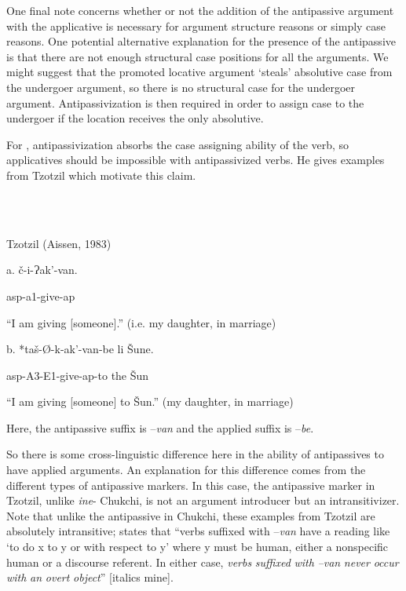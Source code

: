 \documentclass[output=paper,modfonts,nonflat]{langsci/langscibook}
\begin{document}
One final note concerns whether or not the addition of the antipassive argument with the applicative is necessary for argument structure reasons or simply case reasons.  One potential alternative explanation for the presence of the antipassive is that there are not enough structural case positions for all the arguments.  We might suggest that the promoted locative argument ‘steals’ absolutive case from the undergoer argument, so there is no structural case for the undergoer argument.  Antipassivization is then required in order to assign case to the undergoer if the location receives the only absolutive.  

For \citet{Baker1988}, antipassivization absorbs the case assigning ability of the verb, so applicatives should be impossible with antipassivized verbs.  He gives examples from Tzotzil which motivate this claim.\textstyleEndnoteSymbol{} 

\ea%
    \label{ex:key:15}
    \gll\\
        \\
    \glt
    \z

          Tzotzil (Aissen, 1983)

a.  č-i-Ɂak’-van.

  asp{}-a1{}-give{}-ap

  “I am giving [someone].”    (i.e. my daughter, in marriage)

b.  *taš-Ø-k-ak’-van-be  li  Šune.

  asp{}-A3-E1-give-ap{}-to  the  Šun

  “I am giving [someone] to Šun.”  (my daughter, in marriage)

Here, the antipassive suffix is –\textit{van} and the applied suffix is –\textit{be}.

So there is some cross-linguistic difference here in the ability of antipassives to have applied arguments.  An explanation for this difference comes from the different types of antipassive markers.  In this case, the antipassive marker in Tzotzil, unlike \textit{ine}{}- Chukchi, is not an argument introducer but an intransitivizer.  Note that unlike the antipassive in Chukchi, these examples from Tzotzil are absolutely intransitive; \citet[291]{Aissen1993} states that “verbs suffixed with –\textit{van} have a reading like ‘to do x to y or with respect to y’ where y must be human, either a nonspecific human or a discourse referent.  In either case, \textit{verbs} \textit{suffixed} \textit{with} \textit{–van} \textit{never} \textit{occur} \textit{with} \textit{an} \textit{overt} \textit{object}” [italics mine].
\end{document}
